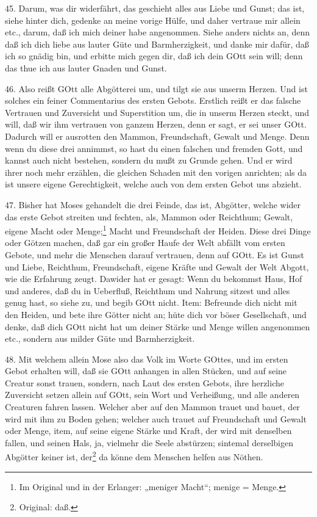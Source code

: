 45. Darum, was dir widerfährt, das geschieht alles aus Liebe und Gunst; das ist, siehe hinter dich, gedenke an meine vorige Hülfe, und daher vertraue mir allein etc., darum, daß ich mich deiner habe angenommen. Siehe anders nichts an, denn daß ich dich liebe aus lauter Güte und Barmherzigkeit, und danke mir dafür, daß ich so gnädig bin, und erbitte mich gegen dir, daß ich dein GOtt sein will; denn das thue ich aus lauter Gnaden und Gunst.

46. Also reißt GOtt alle Abgötterei um, und tilgt sie aus unserm Herzen. Und ist solches ein feiner Commentarius des ersten Gebots. Erstlich reißt er das falsche Vertrauen und Zuversicht und Superstition um, die in unserm Herzen steckt, und will, daß wir ihm vertrauen von ganzem Herzen, denn er sagt, er sei unser GOtt. Dadurch will er ausrotten den Mammon, Freundschaft, Gewalt und Menge. Denn wenn du diese drei annimmst, so hast du einen falschen und fremden Gott, und kannst auch nicht bestehen, sondern du mußt zu Grunde gehen. Und er wird ihrer noch mehr erzählen, die gleichen Schaden mit den vorigen anrichten; als da ist unsere eigene Gerechtigkeit, welche auch von dem ersten Gebot uns abzieht.

47. Bisher hat Moses gehandelt die drei Feinde, das ist, Abgötter, welche wider das erste Gebot streiten und fechten, als, Mammon oder Reichthum; Gewalt, eigene Macht oder Menge;\footnote{Im Original und in der Erlanger: „meniger Macht“; menige = Menge.}
Macht und Freundschaft der Heiden. Diese drei Dinge oder Götzen machen, daß gar ein großer Haufe der Welt abfällt vom ersten Gebote, und mehr die Menschen darauf vertrauen, denn auf GOtt. Es ist Gunst und Liebe, Reichthum, Freundschaft, eigene Kräfte und Gewalt der Welt Abgott, wie die Erfahrung zeugt. Dawider hat er gesagt: Wenn du bekommst Haus, Hof und anderes, daß du in Ueberfluß, Reichthum und Nahrung sitzest und alles genug hast, so siehe zu, und begib GOtt nicht. Item: Befreunde dich nicht mit den Heiden, und bete ihre Götter nicht an; hüte dich vor böser Gesellschaft, und denke, daß dich GOtt nicht hat um deiner Stärke und Menge willen angenommen etc., sondern aus milder Güte und Barmherzigkeit.

48. Mit welchem allein Mose also das Volk im Worte GOttes, und im ersten Gebot erhalten will, daß sie GOtt anhangen in allen Stücken, und auf seine Creatur sonst trauen, sondern, nach Laut des ersten Gebots, ihre herzliche Zuversicht setzen allein auf GOtt, sein Wort und Verheißung, und alle anderen Creaturen fahren lassen. Welcher aber auf den Mammon trauet und bauet, der wird mit ihm zu Boden gehen; welcher auch trauet auf Freundschaft und Gewalt oder Menge, item, auf seine eigene Stärke und Kraft, der wird mit denselben fallen, und seinen Hals, ja, vielmehr die Seele abstürzen; sintemal derselbigen Abgötter keiner ist, der\footnote{Original: daß.} da könne dem Menschen helfen aus Nöthen.

